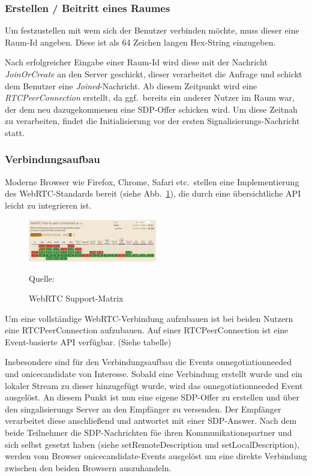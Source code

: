 \documentclass{article}
\newcommand{\figuresource}[1]{
	\begin{center}Quelle: #1\end{center}
}
\begin{document}
\begin{onecolumn}
\subsubsection{Erstellen / Beitritt eines Raumes}

Um festzustellen mit wem sich der Benutzer verbinden möchte, muss dieser
eine Raum-Id angeben. Diese ist als 64 Zeichen langen Hex-String einzugeben.

Nach erfolgreicher Eingabe einer Raum-Id wird diese mit der Nachricht
\textit{JoinOrCreate} an den Server geschickt, dieser verarbeitet die Anfrage
und schickt dem Benutzer eine \textit{Joined}-Nachricht. Ab diesem Zeitpunkt
wird eine \textit{RTCPeerConnection} erstellt, da ggf.\ bereits ein anderer
Nutzer im Raum war, der dem neu dazugekommenen eine SDP-Offer schicken wird.
Um diese Zeitnah zu verarbeiten, findet die Initialisierung vor der ersten
Signalisierungs-Nachricht statt.


\subsubsection{Verbindungsaufbau}\label{browser-webrtc}

Moderne Browser wie Firefox, Chrome, Safari etc.\ stellen eine Implementierung
des WebRTC-Standards bereit (siehe Abb.~\ref{fig:webrtc-support}), die
durch eine übersichtliche API leicht zu integrieren ist. %

\begin{figure}[ht]
	\includegraphics[width=0.5\textwidth]{webrtc-support}
	\centering
	\caption[WebRTC Support-Matrix~\cite{WebRTCSupport}]{WebRTC Support-Matrix}\label{fig:webrtc-support}
	\figuresource{\cite{WebRTCSupport}}
\end{figure}

Um eine vollständige WebRTC-Verbindung aufzubauen ist bei beiden Nutzern eine
RTCPeerConnection aufzubauen. Auf einer RTCPeerConnection ist eine
Event-basierte API verfügbar. (Siehe tabelle)


Insbesondere sind für den Verbindungsaufbau die Events onnegotiationneeded und
onicecandidate von Interesse. Sobald eine Verbindung erstellt wurde und ein
lokaler Stream zu dieser hinzugefügt wurde, wird das onnegotiationneeded Event
ausgelöst. An diesem Punkt ist nun eine eigene SDP-Offer zu erstellen und über
den singalisierungs Server an den Empfänger zu versenden. Der Empfänger
verarbeitet diese anschließend und antwortet mit einer SDP-Answer. Nach dem
beide Teilnehmer die SDP-Nachrichten füe ihren Kommunikationspartner und sich
selbst gesetzt haben (siehe setRemoteDescription und setLocalDescription),
werden vom Browser onicecandidate-Events ausgelöst um eine direkte Verbindung
zwischen den beiden Browsern auszuhandeln.


\end{onecolumn}
\end{document}
